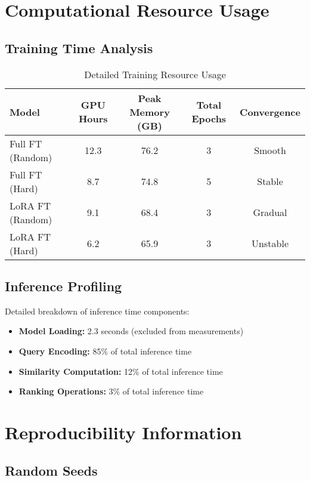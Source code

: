 \section{Computational Resource Usage}

\subsection{Training Time Analysis}

\begin{table}[h]
\centering
\caption{Detailed Training Resource Usage}
\begin{tabular}{lcccc}
\toprule
Model & GPU Hours & Peak Memory (GB) & Total Epochs & Convergence \\
\midrule
Full FT (Random) & 12.3 & 76.2 & 3 & Smooth \\
Full FT (Hard) & 8.7 & 74.8 & 5 & Stable \\
LoRA FT (Random) & 9.1 & 68.4 & 3 & Gradual \\
LoRA FT (Hard) & 6.2 & 65.9 & 3 & Unstable \\
\bottomrule
\end{tabular}
\end{table}

\subsection{Inference Profiling}

Detailed breakdown of inference time components:

\begin{itemize}
\item \textbf{Model Loading:} 2.3 seconds (excluded from measurements)
\item \textbf{Query Encoding:} 85\% of total inference time
\item \textbf{Similarity Computation:} 12\% of total inference time
\item \textbf{Ranking Operations:} 3\% of total inference time
\end{itemize}

\section{Reproducibility Information}

\subsection{Random Seeds}

